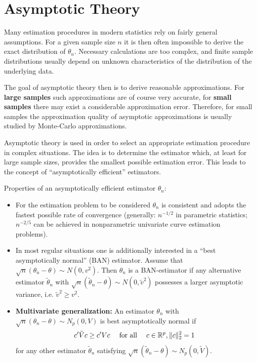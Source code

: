 \documentclass[]{book}
\providecommand{\tightlist}{%
  \setlength{\itemsep}{0pt}\setlength{\parskip}{0pt}}
\theoremstyle{definition}
\theoremstyle{definition}
\theoremstyle{definition}
\theoremstyle{remark}
\begin{document}
\hypertarget{asymptotic-theory}{%
\section{Asymptotic Theory}\label{asymptotic-theory}}

Many estimation procedures in modern statistics rely on fairly general assumptions. For a given sample size \(n\) it is then often impossible to derive the exact distribution of \(\theta_n\). Necessary calculations are too complex, and finite sample distributions usually depend on unknown characteristics of the distribution of the underlying data.

The goal of asymptotic theory then is to derive reasonable approximations. For \textbf{large samples} such approximations are of course very accurate, for \textbf{small samples} there may exist a considerable approximation error. Therefore, for small samples the approximation quality of asymptotic approximations is usually studied by Monte-Carlo approximations.

Asymptotic theory is used in order to select an appropriate estimation procedure in complex situations. The idea is to determine the estimator which, at least for large sample sizes, provides the smallest possible estimation error. This leads to the concept of ``asymptotically efficient'' estimators.

Properties of an asymptotically efficient estimator \(\theta_n\):

\begin{itemize}
\tightlist
\item
  For the estimation problem to be considered \(\theta_n\) is consistent and adopts the fastest possible rate of convergence
  (generally: \(n^{-1/2}\) in parametric statistics; \(n^{-2/5}\) can be achieved in nonparametric univariate curve estimation problems).
\item
  In most regular situations one is additionally interested in a ``best asymptotically normal'' (BAN) estimator. Assume that \(\sqrt{n}(\theta_n -\theta)\sim N(0,v^2)\). Then \(\theta_n\) is a BAN-estimator if any alternative estimator \(\tilde\theta_n\) with
  \(\sqrt{n}(\tilde\theta_n -\theta)\sim N(0,\tilde v^2)\) possesses a larger asymptotic variance, i.e. \(\tilde v^2\geq v^2\).
\item
  \textbf{Multivariate generalization:} An estimator \(\theta_n\) with \(\sqrt{n}(\theta_n -\theta)\sim N_p(0,V)\) is best asymptotically normal if
  \[c'\tilde V c\geq c'Vc\quad\hbox{ for all }\quad c\in\mathbb{R}^p, \Vert c\Vert_2^2=1\]
  for any other estimator \(\tilde\theta_n\) satisfying \(\sqrt{n}(\tilde\theta_n -\theta)\sim N_p(0,\tilde V)\).
\end{itemize}
\end{document}
